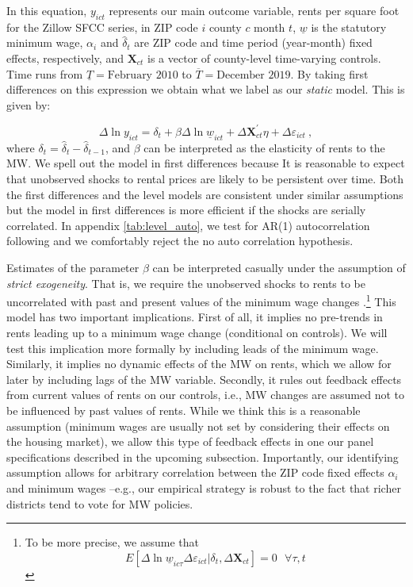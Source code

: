 In this equation, $y_{ict}$ represents our main outcome variable, rents per square foot 
for the Zillow SFCC series, in ZIP code $i$ county $c$ month $t$, $\underline{w}$ is the 
statutory minimum wage, $\alpha_i$ and $\hat{\delta}_t$ are ZIP code and time period (year-month) 
fixed effects, respectively, and $\mathbf{X}_{ct}$ is a vector of county-level time-varying 
controls. Time runs from $\underline{T} = \text{February 2010}$ to $\overline{T} = 
\text{December 2019}$. By taking first differences on this expression we obtain what 
we label as our \textit{static} model. This is given by:
    
\begin{equation}\label{eq:did}
	\Delta \ln y_{ict} = \delta_t
						+ \beta \Delta \ln \underline{w}_{ict}
						+ \Delta \mathbf{X}^{'}_{ct} \eta
						+ \Delta \varepsilon_{ict} \ ,
\end{equation}
where $\delta_t = \hat{\delta}_t - \hat{\delta}_{t-1}$, and $\beta$ can be interpreted 
as the elasticity of rents to the MW. We spell out the model in first differences because 
It is reasonable to expect that unobserved shocks to rental prices are likely to be persistent over 
time. Both the first differences and the level models are consistent under similar assumptions 
but the model in first differences is more efficient if the shocks are serially correlated. In appendix 
\autoref{tab:level_auto}, we test for AR(1) autocorrelation following \textcite[][chapter 10]
{wooldridge2010} and we comfortably reject the no auto correlation hypothesis. 

Estimates of the parameter $\beta$ can be interpreted casually under the assumption of
\textit{strict exogeneity}. That is, we require the unobserved shocks to rents to be uncorrelated
with past and present values of the minimum wage changes \parencite[][chapter 10]
{wooldridge2010}.\footnote{To be more precise, we assume that 
	$$E[\Delta \ln \underline{w}_{ic\tau} \Delta \varepsilon_{ict} | \delta_t, \Delta \mathbf{X}_{ct}] = 0
	\ \ \ \forall \tau, t$$}
This model has two important implications. First of all, it implies no pre-trends in 
rents leading up to a minimum wage change (conditional on controls). We will test this 
implication more formally by including leads of the minimum wage. Similarly, it implies no dynamic 
effects of the MW on rents, which we allow for later by including lags of the 
MW variable. Secondly, it rules out feedback effects from current values of rents 
on our controls, i.e., MW changes are assumed not to be influenced by past values of rents. 
While we think this is a reasonable assumption (minimum wages are usually not set by considering 
their effects on the housing market), we allow this type of feedback effects in one our panel 
specifications described in the upcoming subsection. Importantly, our identifying assumption 
allows for arbitrary correlation between the ZIP code fixed effects $\alpha_i$ and minimum wages 
--e.g., our empirical strategy is robust to the fact that richer districts tend to vote for 
MW policies.

